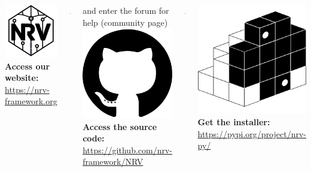 \documentclass{NRVposter}
\begin{document}
\begin{columns}

 

{
\includegraphics[width=0.015\columnwidth]{./images/NRV_bw.pdf}  \textbf{Access our website:} \\ \url{https://nrv-framework.org}\\
            \begin{center}
                \includegraphics[width=0.08\columnwidth]{./images/qrcode_website.png}
            \end{center}
            and enter the forum for help (community page)\\
\includegraphics[width=0.015\columnwidth]{./images/github_logo.png} \textbf{Access the source code:} \\ \url{https://github.com/nrv-framework/NRV}\\
            \begin{center}
                \includegraphics[width=0.08\columnwidth]{./images/qrcode_github.png}
            \end{center}
\includegraphics[width=0.015\columnwidth]{./images/pypi_logo.png} \textbf{Get the installer:} \\ \url{https://pypi.org/project/nrv-py/}\\
}
\end{columns}
\end{document}

